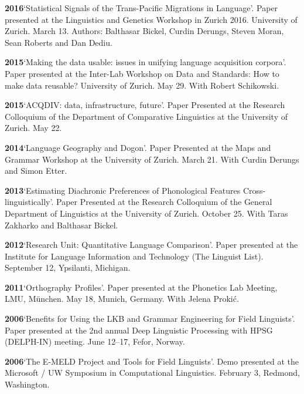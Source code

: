 \documentclass[11pt]{article}
\newcommand{\hangpara}{
 \setlength{\parindent}{0in} %
 \hangindent=0.42in %
}
\begin{document}
\hangpara
\vskip 6pt
{\bf 2016}\hspace{1ex}`Statistical Signals of the Trans-Pacific Migrations in Language'. Paper presented at the Linguistics and Genetics Workshop in Zurich 2016. University of Zurich. March 13. Authors: Balthasar Bickel, Curdin Derungs, Steven Moran, Sean Roberts and Dan Dediu.

\hangpara
\vskip 6pt
{\bf 2015}\hspace{1ex}`Making the data usable: issues in unifying language acquisition corpora'. Paper presented at the Inter-Lab Workshop on Data and Standards: How to make data reusable? University of Zurich. May 29. With Robert Schikowski.

\vskip 6pt
\hangpara
{\bf 2015}\hspace{1ex}`ACQDIV: data, infrastructure, future'. Paper Presented at the Research Colloquium of the Department of Comparative Linguistics at the University of Zurich. May 22.

\vskip 6pt
\hangpara
{\bf 2014}\hspace{1ex}`Language Geography and Dogon'. Paper Presented at the Maps and Grammar Workshop at the University of Zurich. March 21. With Curdin Derungs and Simon Etter.

\vskip 6pt
\hangpara
{\bf 2013}\hspace{1ex}`Estimating Diachronic Preferences of Phonological Features Cross-linguistically'. Paper Presented at the Research Colloquium of the General Department of Linguistics at the University of Zurich. October 25. With Taras Zakharko and Balthasar Bickel.

\vskip 6pt
\hangpara
{\bf 2012}\hspace{1ex}`Research Unit: Quantitative Language Comparison'. Paper presented at the Institute for Language Information and Technology (The Linguist List). September 12, Ypsilanti, Michigan.

\vskip 6pt
\hangpara
{\bf 2011}\hspace{1ex}`Orthography Profiles'. Paper presented at the Phonetics Lab Meeting, LMU, M{\"u}nchen. May 18, Munich, Germany. With Jelena Proki{\'c}.

\vskip 6pt
\hangpara
{\bf 2006}\hspace{1ex}`Benefits for Using the LKB and Grammar Engineering for Field Linguists'. Paper presented at the 2nd annual Deep Linguistic Processing with HPSG (DELPH-IN) meeting. June 12--17, Fefor, Norway.

\vskip 6pt
\hangpara
{\bf 2006}\hspace{1ex}`The E-MELD Project and Tools for Field Linguists'. Demo presented at the Microsoft / UW Symposium in Computational Linguistics. February 3, Redmond, Washington.
\end{document}
